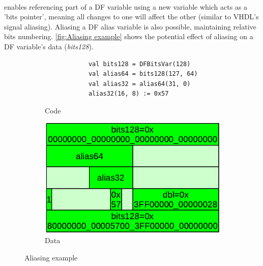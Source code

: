\paragraph{}\cf enables referencing part of a DF variable using a new variable which acts as a 'bits pointer', meaning all changes to one will affect the other (similar to VHDL's signal aliasing). Aliasing a DF alias variable is also possible, maintaining relative bits numbering. \autoref{fig:Aliasing example} shows  the potential effect of aliasing on a DF variable's data (\textit{bits128}).
\begin{figure}[h]
	\centering
	\begin{subfigure}[b]{0.49\textwidth}
		\begin{verbatim}
			val bits128 = DFBitsVar(128)
			val alias64 = bits128(127, 64)
			val alias32 = alias64(31, 0)
			alias32(16, 8) := 0x57		    
		\end{verbatim}
		\caption{Code}
		\label{fig:Aliasing code}
	\end{subfigure}%
	\hfill
	\begin{subfigure}[b]{0.49\textwidth}
		\includegraphics[width=1.0\linewidth]{graphics/Aliasing.pdf}
		\caption{Data}
		\label{fig:Aliasing data}
	\end{subfigure}
	\caption{Aliasing example}\label{fig:Aliasing example}
\end{figure}
